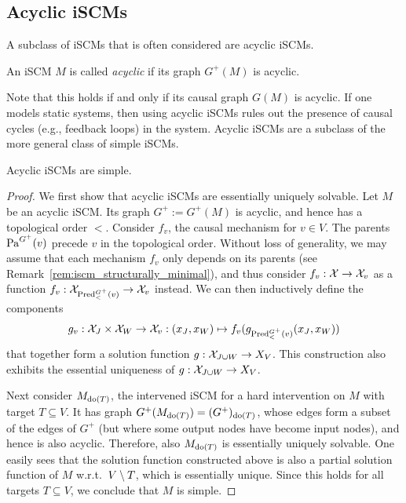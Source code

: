 \subsection{Acyclic iSCMs}\label{sec:acyclic_scms}
A subclass of iSCMs that is often considered are acyclic iSCMs.
\begin{Def}\label{def:scm_acyclic}
  An iSCM $M$ is called \emph{acyclic} if its graph $G^+(M)$ is acyclic.
\end{Def}
Note that this holds if and only if its causal graph $G(M)$ is acyclic.
If one models static systems, then using acyclic iSCMs
rules out the presence of causal cycles (e.g., feedback loops) in the system.
Acyclic iSCMs are a subclass of the more general class of simple iSCMs.
\begin{Prp}\label{prp:acyclic_scms_are_simple}
  Acyclic iSCMs are simple.
\end{Prp}
\begin{proof}
  We first show that acyclic iSCMs are essentially uniquely solvable. Let $M$ be an acyclic iSCM. Its
  graph $G^+ := G^+(M)$ is acyclic, and hence has a topological order $<$. Consider $f_v$, the
  causal mechanism for $v \in V$. The parents $\mathrm{Pa}^{G^+}(v)$ precede $v$ in the topological order.
  Without loss of generality, we may assume that each mechanism $f_v$ only depends on its parents
  (see Remark~\ref{rem:iscm_structurally_minimal}), and thus consider $f_v : \mathcal{X} \to \mathcal{X}_v$ as a function
  $f_v : \mathcal{X}_{\mathrm{Pred}_<^{G^+}(v)} \to \mathcal{X}_v$ instead. We can then inductively define the components
  $$g_v : \mathcal{X}_{J} \times \mathcal{X}_{W} \to \mathcal{X}_v : 
    (x_{J},x_{W}) \mapsto f_v(g_{\mathrm{Pred}_<^{G^+}(v)}(x_{J},x_{W}))$$
  that together form a solution function $g : \mathcal{X}_{J\cup W} \to X_{V}$.
  This construction also exhibits the essential uniqueness of $g : \mathcal{X}_{J\cup W} \to X_{V}$.

  Next consider $M_{\operatorname{do}(T)}$, the intervened iSCM for a hard intervention on $M$ with target $T \subseteq V$. 
  It has graph $G^+(M_{\operatorname{do}(T)}) = (G^+)_{\operatorname{do}(T)}$, whose edges form a subset of the edges of $G^+$ (but
  where some output nodes have become input nodes), and hence is also acyclic. 
  Therefore, also $M_{\operatorname{do}(T)}$ is essentially uniquely solvable. 
  One easily sees that the solution function constructed above is also a partial solution function of $M$ w.r.t.\ $V \setminus T$,
  which is essentially unique.
  Since this holds for all targets $T \subseteq V$, we conclude that $M$ is simple.
\end{proof}

